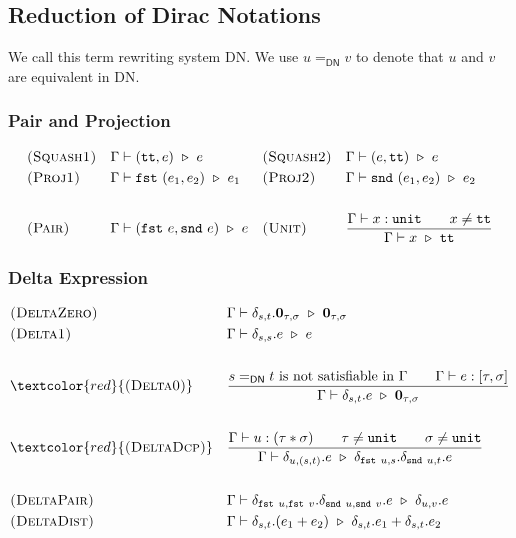 


\subsection{Reduction of Dirac Notations}

We call this term rewriting system \textsf{DN}. We use $u =_{\textsf{DN}} v$ to denote that $u$ and $v$ are equivalent in \textsf{DN}.

\subsubsection*{Pair and Projection}
\begin{align*}
  & \textsc{(Squash1)} && \Gamma \vdash (\utt, e) \reduce e 
  && \textsc{(Squash2)} && \Gamma \vdash (e, \utt) \reduce e \\
  & \textsc{(Proj1)} && \Gamma \vdash \fst\ (e_1, e_2) \reduce e_1
  && \textsc{(Proj2)} && \Gamma \vdash \snd\ (e_1, e_2) \reduce e_2  \\
  \\
  & \textsc{(Pair)} && \Gamma \vdash (\fst\ e, \snd\ e)\reduce e
  && \textsc{(Unit)} && \frac{\Gamma \vdash x : \unit \qquad x \neq \utt}{\Gamma \vdash x\reduce\utt} 
\end{align*}

\subsubsection*{Delta Expression}
\begin{align*}
  & \textsc{(DeltaZero)} && 
  \Gamma \vdash \delta_{s, t}.\mathbf{0}_{\tau, \sigma} \reduce \mathbf{0}_{\tau, \sigma}
  \\
  & \textsc{(Delta1)} && 
  \Gamma \vdash \delta_{s, s}.e \reduce e 
  \\
  \\
  & \textcolor{red}{\textsc{(Delta0)}} && 
  \frac{s =_\textsf{DN} t\ \textrm{is not satisfiable in}\ \Gamma \qquad \Gamma \vdash e : [\tau, \sigma]}{\Gamma \vdash \delta_{s, t}.e \reduce \textbf{0}_{\tau, \sigma}} \\
  \\
  & \textcolor{red}{\textsc{(DeltaDcp)}} && 
  \frac{\Gamma \vdash u : ( \tau * \sigma ) \qquad \tau \neq \unit \qquad \sigma \neq \unit}{\Gamma \vdash \delta_{u, (s, t)}.e \reduce \delta_{\fst\ u, s}.\delta_{\snd\ u, t}.e} 
  \\
  \\
  & \textsc{(DeltaPair)} &&
  \Gamma \vdash \delta_{\fst\ u, \fst\ v}.\delta_{\snd\ u, \snd\ v}.e \reduce \delta_{u, v}.e 
  \\
  & \textsc{(DeltaDist)} &&
  \Gamma \vdash \delta_{s, t}.(e_1 + e_2) \reduce \delta_{s, t}.e_1 + \delta_{s, t}.e_2
\end{align*}

